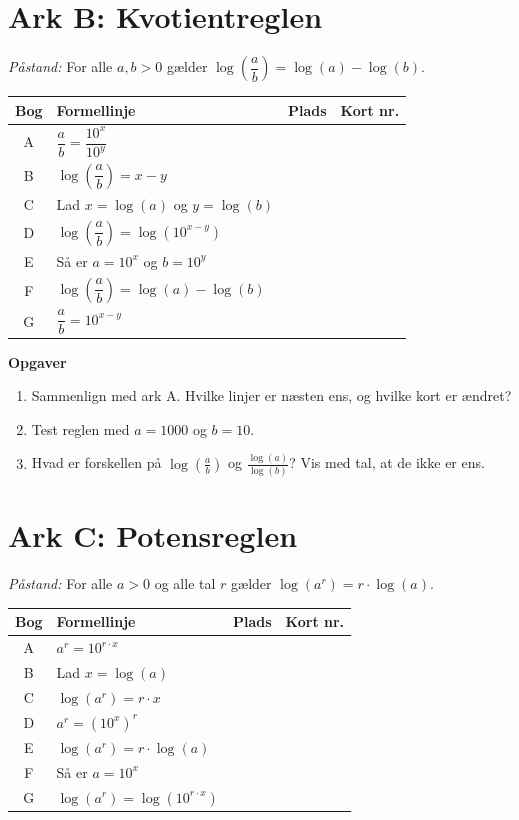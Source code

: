 \documentclass[a4paper,11pt]{article}
\begin{document}
\newpage
\section*{Ark B: Kvotientreglen}
\label{sec:org0abf818}

\emph{Påstand:} For alle \(a,b>0\) gælder \(\log\left(\dfrac ab\right)=\log(a)-\log(b)\).

\begin{center}
\begin{tabular}{|c|l|c|p{2.5cm}|}
\hline
Bog & Formellinje & Plads & Kort nr.\\
\hline
A & \(\dfrac ab=\dfrac{10^x}{10^y}\) &  & \\
B & \(\log\left(\dfrac ab\right)=x-y\) &  & \\
C & Lad \(x=\log(a)\) og \(y=\log(b)\) &  & \\
D & \(\log\left(\dfrac ab\right)=\log(10^{x-y})\) &  & \\
E & Så er \(a=10^x\) og \(b=10^y\) &  & \\
F & \(\log\left(\dfrac ab\right)=\log(a)-\log(b)\) &  & \\
G & \(\dfrac ab=10^{x-y}\) &  & \\
\hline
\end{tabular}
\end{center}

\textbf{Opgaver}
\begin{enumerate}
\item Sammenlign med ark A. Hvilke linjer er næsten ens, og hvilke kort er ændret?
\item Test reglen med \(a=1000\) og \(b=10\).
\item Hvad er forskellen på \(\log\left(\frac ab\right)\) og \(\frac{\log(a)}{\log(b)}\)? Vis med tal, at de ikke er ens.
\end{enumerate}

\newpage
\section*{Ark C: Potensreglen}
\label{sec:org989f878}

\emph{Påstand:} For alle \(a>0\) og alle tal \(r\) gælder \(\log(a^r)=r\cdot\log(a)\).

\begin{center}
\begin{tabular}{|c|l|c|p{2.5cm}|}
\hline
Bog & Formellinje & Plads & Kort nr.\\
\hline
A & \(a^r=10^{r\cdot x}\) &  & \\
B & Lad \(x=\log(a)\) &  & \\
C & \(\log(a^r)=r\cdot x\) &  & \\
D & \(a^r=(10^x)^r\) &  & \\
E & \(\log(a^r)=r\cdot\log(a)\) &  & \\
F & Så er \(a=10^x\) &  & \\
G & \(\log(a^r)=\log(10^{r\cdot x})\) &  & \\
\hline
\end{tabular}
\end{center}
\end{document}
